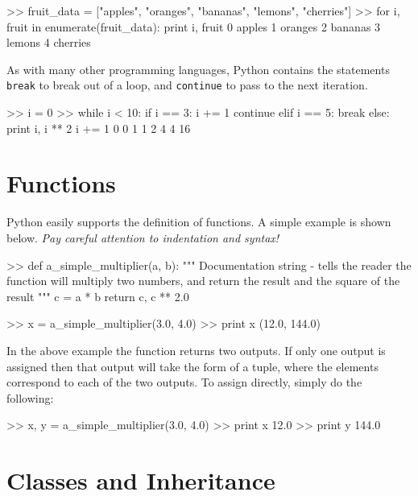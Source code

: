 \begin{python}[frame=single]
>> fruit_data = ["apples", "oranges", "bananas", "lemons", 
                 "cherries"]
>> for i, fruit in enumerate(fruit_data):
       print i, fruit
0  apples
1  oranges
2  bananas
3  lemons
4  cherries 
\end{python}

As with many other programming languages, Python contains the statements \verb=break= to break out of a loop, and \verb=continue= to pass to the next iteration.

\begin{python}[frame=single]
>> i = 0
>> while i < 10:
       if i == 3:
           i += 1
           continue
       elif i == 5:
           break
       else:
           print i, i ** 2
       i += 1
0  0
1  1
2  4
4  16
\end{python}

\section{Functions}

Python easily supports the definition of functions. A simple example is shown below. \emph{Pay careful attention to indentation and syntax!}

\begin{python}[frame=single]
>> def a_simple_multiplier(a, b):
       """
       Documentation string - tells the reader the function 
       will multiply two numbers, and return the result and
       the square of the result
       """
       c = a * b
       return c, c ** 2.0

>> x = a_simple_multiplier(3.0, 4.0)
>> print x
(12.0, 144.0)
\end{python}

In the above example the function returns two outputs. If only one output is assigned then that output will take the form of a tuple, where the elements correspond to each of the two outputs. To assign directly, simply do the following:

\begin{python}[frame=single]
>> x, y = a_simple_multiplier(3.0, 4.0)
>> print x
12.0
>> print y
144.0
\end{python}

\section{Classes and Inheritance}

